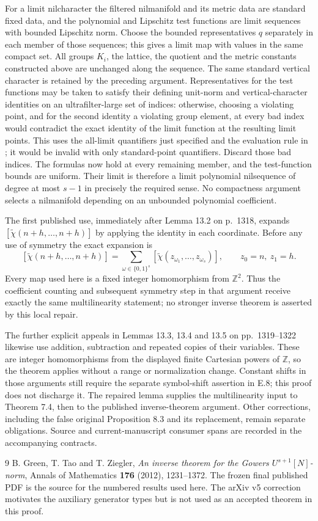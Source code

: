 \documentclass[11pt]{article}
\newcommand{\Z}{\mathbb Z}
\begin{document}
For a limit nilcharacter the filtered nilmanifold and its metric data are
standard fixed data, and the polynomial and Lipschitz test functions are
limit sequences with bounded Lipschitz norm. Choose the bounded representatives
$q$ separately in each member of those sequences; this gives a limit map
with values in the same compact set. All groups $K_i$, the lattice,
the quotient and the metric constants constructed above are unchanged along
the sequence. The same standard vertical character is retained by the preceding
argument. Representatives for the test functions may be taken to satisfy
their defining unit-norm and vertical-character identities on an
ultrafilter-large set of indices: otherwise, choosing a violating point,
and for the second identity a violating group element, at every bad index
would contradict the exact identity of the limit function at the resulting
limit points. This uses the all-limit quantifiers just specified and the
evaluation rule in \cite[Definition A.3]{GTZ}; it would be invalid with only
standard-point quantifiers. Discard those bad indices. The formulas now hold at every
remaining member, and the test-function bounds are uniform. Their limit is
therefore a limit polynomial nilsequence of
degree at most $s-1$ in precisely the required sense. No compactness argument
selects a nilmanifold depending on an unbounded polynomial coefficient.

The first published use, immediately after Lemma 13.2 on p.~1318, expands
$[\widetilde\chi(n+h,\ldots,n+h)]$ by applying the identity in each
coordinate. Before any use of symmetry the exact expansion is
\[
 [\widetilde\chi(n+h,\ldots,n+h)]
 =\sum_{\omega\in\{0,1\}^s}
 [\widetilde\chi(z_{\omega_1},\ldots,z_{\omega_s})],
 \qquad z_0=n,\ z_1=h.
\]
Every map used here is a fixed integer homomorphism from $\Z^2$.
Thus the coefficient counting and subsequent symmetry step in that argument
receive exactly the same multilinearity statement; no stronger inverse
theorem is asserted by this local repair.

The further explicit appeals in Lemmas 13.3, 13.4 and 13.5 on
pp.~1319--1322 likewise use addition, subtraction and repeated copies of
their variables. These are integer homomorphisms from the displayed finite
Cartesian powers of $\Z$, so the theorem applies without a range or
normalization change. Constant shifts in those arguments still require the
separate symbol-shift assertion in E.8; this proof does not discharge it.
The repaired lemma supplies the multilinearity input to Theorem 7.4,
then to the published inverse-theorem argument. Other corrections, including
the false original Proposition 8.3 and its replacement, remain separate
obligations. Source and current-manuscript consumer spans are recorded in
the accompanying contracts.

\begin{thebibliography}{9}
B. Green, T. Tao and T. Ziegler,
\emph{An inverse theorem for the Gowers $U^{s+1}[N]$-norm},
Annals of Mathematics \textbf{176} (2012), 1231--1372.
The frozen final published PDF is the source for the numbered results used
here. The arXiv v5 correction motivates the auxiliary generator types but is
not used as an accepted theorem in this proof.
\end{thebibliography}
\end{document}
